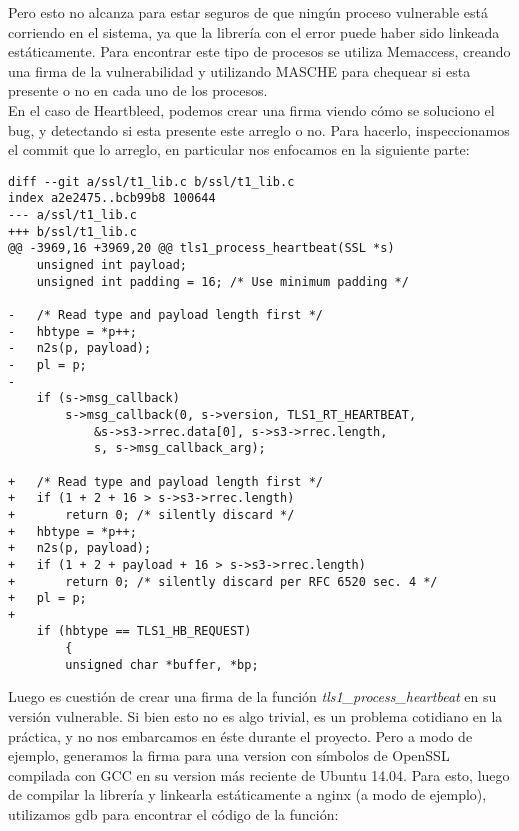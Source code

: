 Pero esto no alcanza para estar seguros de que ningún proceso vulnerable está
corriendo en el sistema, ya que la librería con el error puede haber sido
linkeada estáticamente. Para encontrar este tipo de procesos se utiliza
Memaccess, creando una firma de la vulnerabilidad y utilizando MASCHE para
chequear si esta presente o no en cada uno de los procesos.\\

En el caso de Heartbleed, podemos crear una firma viendo cómo se soluciono el
bug, y detectando si esta presente este arreglo o no. Para hacerlo,
inspeccionamos el commit que lo arreglo, en particular nos enfocamos en la
siguiente parte:

\begin{lstlisting}
diff --git a/ssl/t1_lib.c b/ssl/t1_lib.c
index a2e2475..bcb99b8 100644
--- a/ssl/t1_lib.c
+++ b/ssl/t1_lib.c
@@ -3969,16 +3969,20 @@ tls1_process_heartbeat(SSL *s)
 	unsigned int payload;
 	unsigned int padding = 16; /* Use minimum padding */

-	/* Read type and payload length first */
-	hbtype = *p++;
-	n2s(p, payload);
-	pl = p;
-
 	if (s->msg_callback)
 		s->msg_callback(0, s->version, TLS1_RT_HEARTBEAT,
 			&s->s3->rrec.data[0], s->s3->rrec.length,
 			s, s->msg_callback_arg);

+	/* Read type and payload length first */
+	if (1 + 2 + 16 > s->s3->rrec.length)
+		return 0; /* silently discard */
+	hbtype = *p++;
+	n2s(p, payload);
+	if (1 + 2 + payload + 16 > s->s3->rrec.length)
+		return 0; /* silently discard per RFC 6520 sec. 4 */
+	pl = p;
+
 	if (hbtype == TLS1_HB_REQUEST)
 		{
 		unsigned char *buffer, *bp;
\end{lstlisting}

Luego es cuestión de crear una firma de la función
\textit{tls1\_process\_heartbeat} en su versión vulnerable. Si bien esto no es algo
trivial, es un problema cotidiano en la práctica, y no nos embarcamos en éste
durante el proyecto. Pero a modo de ejemplo, generamos la firma para una
version con símbolos de OpenSSL compilada con GCC en su version más reciente de
Ubuntu 14.04. Para esto, luego de compilar la librería y linkearla
estáticamente a nginx (a modo de ejemplo), utilizamos gdb para encontrar el
código de la función:

